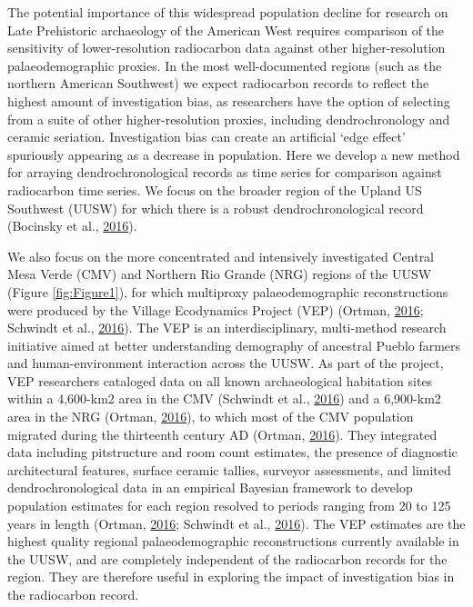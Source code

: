 \documentclass[
]{article}
\begin{document}
The potential importance of this widespread population decline for research on Late Prehistoric archaeology of the American West requires comparison of the sensitivity of lower-resolution radiocarbon data against other higher-resolution palaeodemographic proxies. In the most well-documented regions (such as the northern American Southwest) we expect radiocarbon records to reflect the highest amount of investigation bias, as researchers have the option of selecting from a suite of other higher-resolution proxies, including dendrochronology and ceramic seriation. Investigation bias can create an artificial `edge effect' spuriously appearing as a decrease in population. Here we develop a new method for arraying dendrochronological records as time series for comparison against radiocarbon time series. We focus on the broader region of the Upland US Southwest (UUSW) for which there is a robust dendrochronological record (Bocinsky et al., \protect\hyperlink{ref-Bocinsky2016}{2016}).

We also focus on the more concentrated and intensively investigated Central Mesa Verde (CMV) and Northern Rio Grande (NRG) regions of the UUSW (Figure \ref{fig:Figure1}), for which multiproxy palaeodemographic reconstructions were produced by the Village Ecodynamics Project (VEP) (Ortman, \protect\hyperlink{ref-Ortman2016}{2016}; Schwindt et al., \protect\hyperlink{ref-Schwindt2016}{2016}). The VEP is an interdisciplinary, multi-method research initiative aimed at better understanding demography of ancestral Pueblo farmers and human-environment interaction across the UUSW. As part of the project, VEP researchers cataloged data on all known archaeological habitation sites within a 4,600-km2 area in the CMV (Schwindt et al., \protect\hyperlink{ref-Schwindt2016}{2016}) and a 6,900-km2 area in the NRG (Ortman, \protect\hyperlink{ref-Ortman2016}{2016}), to which most of the CMV population migrated during the thirteenth century AD (Ortman, \protect\hyperlink{ref-Ortman2016}{2016}). They integrated data including pitstructure and room count estimates, the presence of diagnostic architectural features, surface ceramic tallies, surveyor assessments, and limited dendrochronological data in an empirical Bayesian framework to develop population estimates for each region resolved to periods ranging from 20 to 125 years in length (Ortman, \protect\hyperlink{ref-Ortman2016}{2016}; Schwindt et al., \protect\hyperlink{ref-Schwindt2016}{2016}). The VEP estimates are the highest quality regional palaeodemographic reconstructions currently available in the UUSW, and are completely independent of the radiocarbon records for the region. They are therefore useful in exploring the impact of investigation bias in the radiocarbon record.
\end{document}
